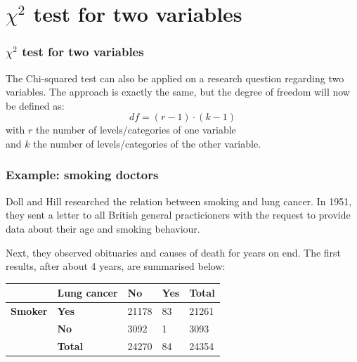 \documentclass{beamer}
\begin{document}
\section{$\chi^{2}$ test for two variables}
\sectionframelogo{}

\begin{frame}
  \frametitle{$\chi^{2}$ test for two variables}
  The Chi-squared test can also be applied on a research question regarding two variables.
\vfill
  The approach is exactly the same, but the degree of freedom will now be defined as:
 \[ df = (r-1) \cdot (k-1) \]
  with $r$ the number of levels/categories of one variable\\
  and $k$ the number of levels/categories of the other variable.
\end{frame}

\begin{frame}
  \frametitle{Example: smoking doctors}
  
  Doll and Hill researched the relation between smoking and lung cancer. In 1951, they sent a letter to all British general practicioners with the request to provide data about their age and smoking behaviour.
  
  Next, they observed obituaries and causes of death for years on end. The first results, after about 4 years, are summarised below:

  \begin{table}[h]
    \begin{tabular}{@{}lllll@{}}
    	\toprule
    	                & \textbf{Lung cancer} & \textbf{No} & \textbf{Yes} & \textbf{Total} \\ \midrule
    	\textbf{Smoker} & \textbf{Yes}         & 21178       & 83           & 21261          \\
    	                & \textbf{No}          & 3092        & 1            & 3093           \\
    	                & \textbf{Total}       & 24270       & 84           & 24354          \\ \bottomrule
    \end{tabular}
  \end{table}
\end{frame}
\end{document}
